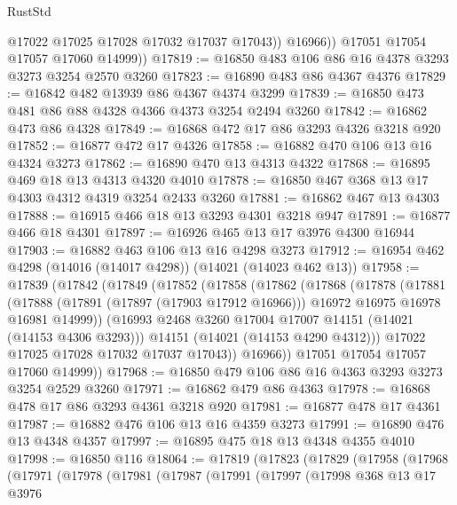 \begin{lexlean}{RustStd}
\begin{coremodule}
{\begin{coremodule}
{{{{{{{{{{{{{{{{{{{{{{{{{{{{{{{{{{{{{{{                @17022
                @17025
                @17028
                @17032
                @17037
                @17043))
            @16966))
        @17051
        @17054
        @17057
        @17060
        @14999))
@17819 := @16850 @483 @106 @86 @16 @4378 @3293 @3273 @3254 @2570 @3260
@17823 := @16890 @483 @86 @4367 @4376
@17829 := @16842 @482 @13939 @86 @4367 @4374 @3299
@17839 := @16850 @473 @481 @86 @88 @4328 @4366 @4373 @3254 @2494 @3260
@17842 := @16862 @473 @86 @4328
@17849 := @16868 @472 @17 @86 @3293 @4326 @3218 @920
@17852 := @16877 @472 @17 @4326
@17858 := @16882 @470 @106 @13 @16 @4324 @3273
@17862 := @16890 @470 @13 @4313 @4322
@17868 := @16895 @469 @18 @13 @4313 @4320 @4010
@17878 := @16850 @467 @368 @13 @17 @4303 @4312 @4319 @3254 @2433 @3260
@17881 := @16862 @467 @13 @4303
@17888 := @16915 @466 @18 @13 @3293 @4301 @3218 @947
@17891 := @16877 @466 @18 @4301
@17897 := @16926 @465 @13 @17 @3976 @4300 @16944
@17903 := @16882 @463 @106 @13 @16 @4298 @3273
@17912 := @16954 @462 @4298 (@14016 (@14017 @4298)) (@14021 (@14023 @462 @13))
@17958 := @17839
    (@17842
      (@17849
        (@17852
          (@17858
            (@17862
              (@17868
                (@17878
                  (@17881
                    (@17888
                      (@17891 (@17897 (@17903 @17912 @16966)))
                      @16972
                      @16975
                      @16978
                      @16981
                      @14999))
                  (@16993 @2468 @3260 @17004 @17007 @14151 (@14021 (@14153 @4306 @3293)))
                  @14151
                  (@14021 (@14153 @4290 @4312)))
                @17022
                @17025
                @17028
                @17032
                @17037
                @17043))
            @16966))
        @17051
        @17054
        @17057
        @17060
        @14999))
@17968 := @16850 @479 @106 @86 @16 @4363 @3293 @3273 @3254 @2529 @3260
@17971 := @16862 @479 @86 @4363
@17978 := @16868 @478 @17 @86 @3293 @4361 @3218 @920
@17981 := @16877 @478 @17 @4361
@17987 := @16882 @476 @106 @13 @16 @4359 @3273
@17991 := @16890 @476 @13 @4348 @4357
@17997 := @16895 @475 @18 @13 @4348 @4355 @4010
@17998 := @16850 @116
@18064 := @17819
    (@17823
      (@17829
        (@17958
          (@17968
            (@17971
              (@17978
                (@17981
                  (@17987
                    (@17991
                      (@17997
                        (@17998
                          @368
                          @13
                          @17
                          @3976
}}}}}}}}}}}}}}}}}}}}}}}}}}}}}}}}}}}}}}}
\end{coremodule}}
\end{coremodule}
\end{lexlean}
